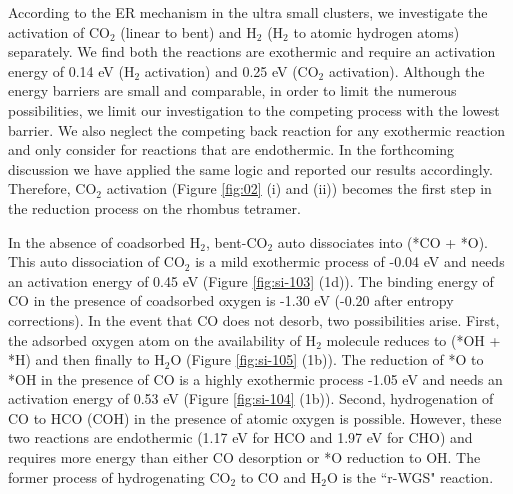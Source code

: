 According to the ER mechanism in the ultra small clusters, we investigate the activation of CO$_2$ (linear to bent) and H$_2$ (H$_2$ to atomic hydrogen atoms) separately. We find both the reactions are exothermic and require an activation energy of 0.14 eV (H$_2$ activation) and 0.25 eV (CO$_2$ activation). Although the energy barriers are small and comparable, in order to limit the numerous possibilities, we limit our investigation to the competing process with the lowest barrier. We also neglect the competing back reaction for any exothermic reaction and only consider for reactions that are endothermic. In the forthcoming discussion we have applied the same logic and reported our results accordingly. Therefore, CO$_2$ activation  (Figure \ref{fig:02} (i) and (ii)) becomes the first step in the reduction process on the rhombus tetramer.  

In the absence of coadsorbed H$_2$, bent-CO$_2$ auto dissociates into (*CO + *O). This auto dissociation of CO$_2$ is a mild exothermic process of -0.04 eV and needs an activation energy of 0.45 eV (Figure \ref{fig:si-103} (1d)). The binding energy of CO in the presence of coadsorbed oxygen is -1.30 eV (-0.20 after entropy corrections). In the event that CO does not desorb, two possibilities arise. First, the adsorbed oxygen atom on the availability of H$_2$ molecule reduces to (*OH + *H) and then finally to H$_2$O (Figure \ref{fig:si-105} (1b)). The reduction of *O to *OH in the presence of CO is a highly exothermic process -1.05 eV and needs an activation energy of 0.53 eV (Figure \ref{fig:si-104} (1b)). Second, hydrogenation of CO to HCO (COH) in the presence of atomic oxygen is possible. However, these two reactions are endothermic (1.17 eV for HCO and 1.97 eV for CHO)  and requires more energy than either CO desorption or *O reduction to OH. The former process of hydrogenating CO$_2$ to CO and H$_2$O is the ``r-WGS" reaction. 

